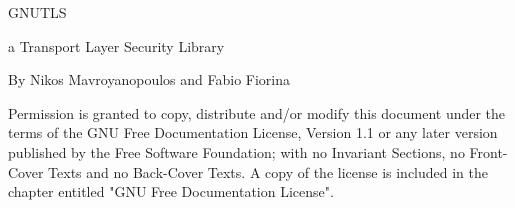 \thispagestyle{empty}

\setlength{\parindent}{0mm}

\setlength{\parskip}{0mm}

 {\Huge GNUTLS\\[.1mm]}
 \HRule
 \begin{flushright}
  a Transport Layer Security Library
 \end{flushright}


 {\Large By Nikos Mavroyanopoulos and Fabio Fiorina\\[.1mm]}
 \HRule
 
\newpage


\begin{center}
\par
Permission is granted to copy, distribute and/or modify this
document under the terms of the GNU Free Documentation License,
Version 1.1 or any later version published by the Free Software
Foundation; with no Invariant Sections, no Front-Cover Texts and
no Back-Cover Texts.  A copy of the license is included in the
chapter entitled "GNU Free Documentation License".
\end{center}

